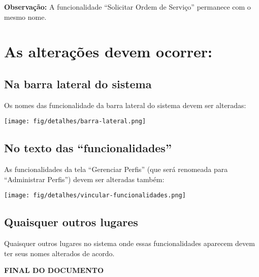 \textbf{Observação:}
A funcionalidade ``Solicitar Ordem de Serviço'' permanece com o mesmo nome.


\section{As alterações devem ocorrer:}


\subsection{Na barra lateral do sistema}

	Os nomes das funcionalidade da barra lateral do sistema devem ser alteradas:
		
	\texttt{[image: fig/detalhes/barra-lateral.png]}
	

\subsection{No texto das ``funcionalidades''}

	As funcionalidades da tela ``Gerenciar Perfis'' (que será renomeada para ``Administrar Perfis'') devem ser alteradas também:


	\texttt{[image: fig/detalhes/vincular-funcionalidades.png]}
	
\subsection{Quaisquer outros lugares}

	Quaisquer outros lugares no sistema onde essas funcionalidades aparecem devem ter seus nomes alterados de acordo.  
	
	
	\begin{center}
		\Large
		\textbf{FINAL DO DOCUMENTO}
		\normalsize
	\end{center}
	

